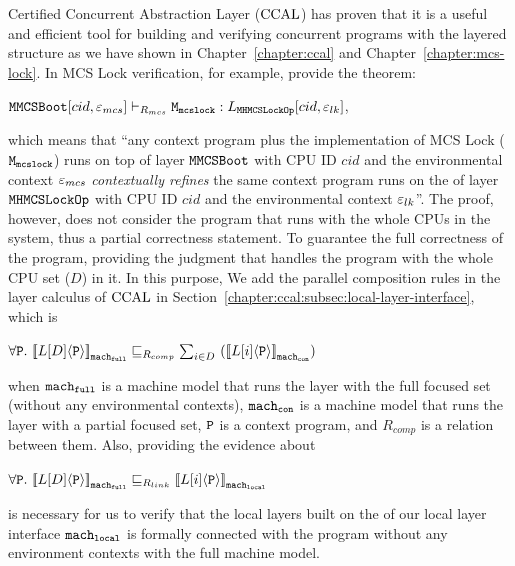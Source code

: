 Certified Concurrent Abstraction Layer  ($\mathrm{CCAL}$) 
has proven that it is a useful and efficient tool 
for building and verifying concurrent programs with the layered structure 
as we have shown in Chapter~\ref{chapter:ccal} and Chapter~\ref{chapter:mcs-lock}.
In MCS Lock verification, for example, provide 
the theorem:
\begin{center}
${\mathrm{\texttt{MMCSBoot}}}[cid, {\varepsilon}_{mcs}] \vdash_{R_{mcs}} {\mathrm{\texttt{M}}}_{{\mathrm{\texttt{mcslock}}}} : L_{{\mathrm{\texttt{MHMCSLockOp}}}}[cid, {\varepsilon}_{lk}]$,
\end{center}
which means that ``any context program plus the implementation of MCS Lock (${\mathrm{\texttt{M}}}_{{\mathrm{\texttt{mcslock}}}}$) runs on top of 
  layer ${\mathrm{\texttt{MMCSBoot}}}$ with CPU ID $cid$ and the environmental context ${\varepsilon}_{mcs}$ \textit{contextually refines}
 the same context program runs on the of  layer ${\mathrm{\texttt{MHMCSLockOp}}}$ with CPU ID $cid$ and the environmental context ${\varepsilon}_{lk}$''. 
The proof, however, does not consider the program that runs with the whole CPUs in the system, thus a partial correctness statement. 
To guarantee the full correctness of the program,
providing the judgment that handles the program with the whole CPU set ($D$) in it. 
In this purpose, 
We add the parallel composition rules in the layer calculus of $\mathrm{CCAL}$ in Section~\ref{chapter:ccal:subsec:local-layer-interface}, which is 
\begin{center}
$\forall \codeinmath{P}. \ \semwmachine{L[D]}{\codeinmath{P}}{\codeinmath{mach}_{\codeinmath{full}}} \refines_{R_{comp}} \sum_{i \in D}\  (\semwmachine{L[i]}{\codeinmath{P}}{\codeinmath{mach}_{\codeinmath{con}}})$
\end{center}
when ${\mathrm{\texttt{mach}}}_{{\mathrm{\texttt{full}}}}$ is a machine model that runs the layer with the full focused set (without any environmental contexts),
${\mathrm{\texttt{mach}}}_{{\mathrm{\texttt{con}}}}$ is a machine model that runs the layer with a partial focused set,
${\mathrm{\texttt{P}}}$ is a context program, 
and $R_{comp}$ is a relation between them.
Also, 
providing the evidence about
\begin{center}
$\forall \codeinmath{P}. \ \semwmachine{L[D]}{\codeinmath{P}}{\codeinmath{mach}_{\codeinmath{full}}} \refines_{R_{link}} \semwmachine{L[i]}{\codeinmath{P}}{\codeinmath{mach}_{\codeinmath{local}}}$
\end{center}
is necessary for us to verify that
the local layers built on the of our local layer interface ${\mathrm{\texttt{mach}}}_{{\mathrm{\texttt{local}}}}$ is 
formally connected with the program without any environment contexts with the full machine model. 
